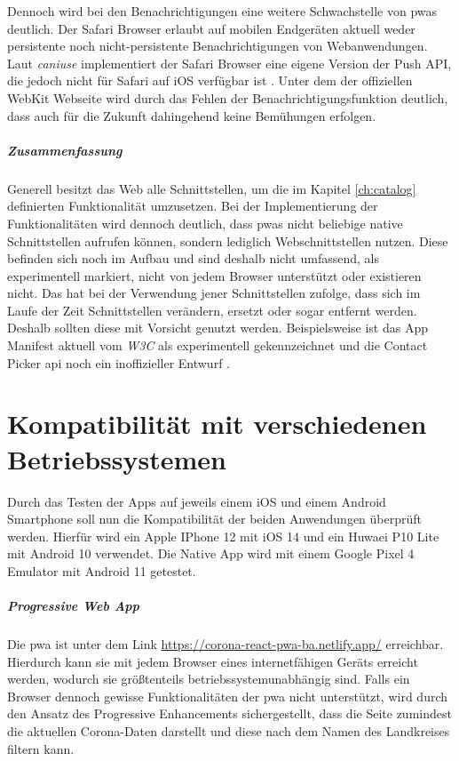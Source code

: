 Dennoch wird bei den Benachrichtigungen eine weitere Schwachstelle von \acp{pwa} deutlich.
Der Safari Browser erlaubt auf mobilen Endgeräten aktuell weder persistente noch nicht-persistente Benachrichtigungen von Webanwendungen.
Laut \textit{caniuse} implementiert der Safari Browser eine eigene Version der Push API, die jedoch nicht für Safari auf iOS verfügbar ist \cite{caniuse.com.2021}.
Unter dem  der offiziellen WebKit Webseite wird durch das Fehlen der Benachrichtigungsfunktion deutlich, dass auch für die Zukunft dahingehend keine Bemühungen erfolgen.

\subparagraph{Zusammenfassung\\}
Generell besitzt das Web alle Schnittstellen, um die im Kapitel \ref{ch:catalog} definierten Funktionalität umzusetzen.
Bei der Implementierung der Funktionalitäten wird dennoch deutlich, dass \acp{pwa} nicht beliebige native Schnittstellen aufrufen können, sondern lediglich Webschnittstellen nutzen.
Diese befinden sich noch im Aufbau und sind deshalb nicht umfassend, als experimentell markiert, nicht von jedem Browser unterstützt oder existieren nicht.
Das hat bei der Verwendung jener Schnittstellen zufolge, dass sich im Laufe der Zeit Schnittstellen verändern, ersetzt oder sogar entfernt werden.
Deshalb sollten diese mit Vorsicht genutzt werden.
Beispielsweise ist das App Manifest aktuell vom \textit{W3C} als experimentell gekennzeichnet und die Contact Picker \ac{api} noch ein inoffizieller Entwurf \cite{MDNcontributors.d}\cite{Beverloo.2021}.

\section{Kompatibilität mit verschiedenen Betriebssystemen} 
Durch das Testen der Apps auf jeweils einem iOS und einem Android Smartphone soll nun die Kompatibilität der beiden Anwendungen überprüft werden.
Hierfür wird ein Apple IPhone 12 mit iOS 14 und ein Huwaei P10 Lite mit Android 10 verwendet.
Die Native App wird mit einem Google Pixel 4 Emulator mit Android 11 getestet.

\subparagraph{Progressive Web App\\}
Die \ac{pwa} ist unter dem Link \url{https://corona-react-pwa-ba.netlify.app/} erreichbar.
Hierdurch kann sie mit jedem Browser eines internetfähigen Geräts erreicht werden, wodurch sie größtenteils betriebssystemunabhängig sind.
Falls ein Browser dennoch gewisse Funktionalitäten der \ac{pwa} nicht unterstützt, wird durch den Ansatz des Progressive Enhancements sichergestellt, dass die Seite zumindest die aktuellen Corona-Daten darstellt und diese nach dem Namen des Landkreises filtern kann.

